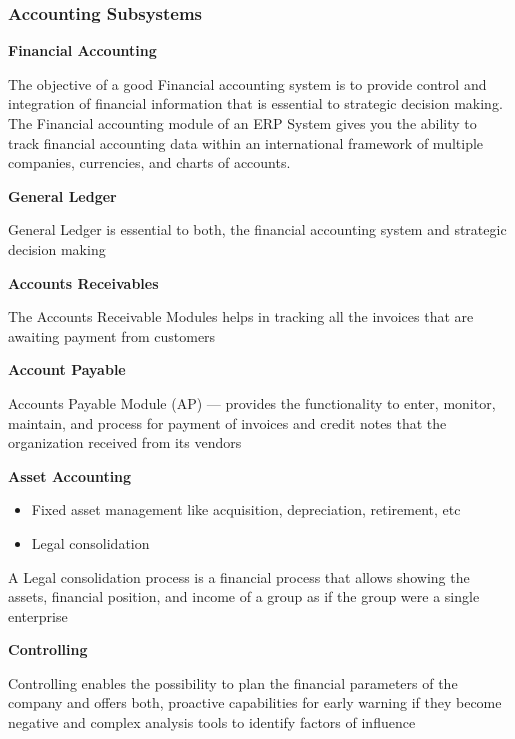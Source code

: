 \subsubsection{Accounting Subsystems}

\begin{adjustwidth}{2cm}{}
\textbf{Financial Accounting}
    \begin{adjustwidth}{1cm}{}
        The objective of a good Financial accounting system is to provide control and integration
of financial information that is essential to strategic decision making. The Financial
accounting module of an ERP System gives you the ability to track financial accounting
data within an international framework of multiple companies, currencies, and charts of
accounts.\\
    \end{adjustwidth}
\textbf{General Ledger}
    \begin{adjustwidth}{1cm}{}
        General Ledger is essential to both, the financial accounting system and strategic decision
making\\
    \end{adjustwidth}
\textbf{Accounts Receivables}
    \begin{adjustwidth}{1cm}{}
        The Accounts Receivable Modules helps in tracking all the invoices that are awaiting
payment from customers\\
    \end{adjustwidth}
\textbf{Account Payable}
    \begin{adjustwidth}{1cm}{}
        Accounts Payable Module (AP) — provides the functionality to enter, monitor, maintain,
and process for payment of invoices and credit notes that the organization received from its
vendors\\
    \end{adjustwidth}
\textbf{Asset Accounting}
    \begin{adjustwidth}{1cm}{}
        \begin{itemize}
            \item Fixed asset management like acquisition, depreciation, retirement, etc
            \item Legal consolidation
        \end{itemize}
        A Legal consolidation process is a financial process that allows showing the assets,
financial position, and income of a group as if the group were a single enterprise\\
    \end{adjustwidth}
\textbf{Controlling}
    \begin{adjustwidth}{1cm}{}
        Controlling enables the possibility to plan the financial parameters of the company and
offers both, proactive capabilities for early warning if they become negative and complex
analysis tools to identify factors of influence\\
    \end{adjustwidth}
\end{adjustwidth}
